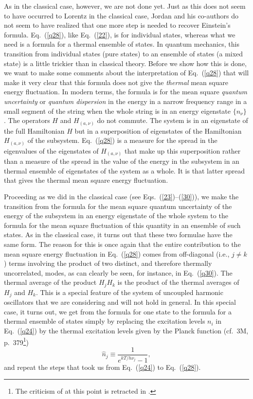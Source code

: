 \documentclass[12pt]{elsart}
\begin{document}
{As in the classical case, however, we are not done yet. Just as this does not seem to have occurred to Lorentz in the classical case, Jordan and his co-authors do not seem to have realized that one more step is needed to recover Einstein's formula. Eq.\ (\ref{q28}), like Eq.\ (\ref{22}), is for individual states, whereas what we need is a formula for a thermal ensemble of states. In quantum mechanics, this transition from individual states (pure states) to an ensemble of states (a mixed state) is a little trickier than in classical theory. Before we show how this is done, we 
want to make some comments about the interpretation of Eq.\ (\ref{q28}) that will make it very clear that this formula does not give the {\it thermal} mean square energy fluctuation. In modern terms,
the formula is for the mean square {\it quantum uncertainty} or {\it quantum dispersion} in the energy in a narrow frequency range in a small segment of the string when the whole string is in an energy eigenstate $\{ n_\nu \}$ . The operators $H$ and $H_{(a, \nu)}$ do not commute. The system is in an eigenstate of the full Hamiltonian $H$ but in a superposition of eigenstates of the Hamiltonian $H_{(a, \nu)}$ of the subsystem. Eq.\ (\ref{q28}) is a measure for the spread in the eigenvalues of the eigenstates of $H_{(a, \nu)}$ that make up this superposition rather than a measure of the spread in the value of the energy in the subsystem in an thermal ensemble of eigenstates of the system as a whole. It is that latter spread that gives the thermal mean square energy fluctuation. 

Proceeding as we did in the classical case (see Eqs.\ (\ref{23})--(\ref{30})), we make the transition from the formula for the mean square quantum uncertainty of the energy of the subsystem in an energy eigenstate of the whole system to the formula for the mean square fluctuation of this quantity in an ensemble of such states. As in the classical case, it turns out that these two formulae have the same form. The reason for this is once again that the entire
contribution to the mean square energy fluctuation in Eq.\ (\ref{q28}) comes from off-diagonal (i.e., $j \neq k$) terms involving the
product of two distinct, and therefore thermally uncorrelated, modes, as can clearly be seen, for instance, in Eq.\ (\ref{q30}). The thermal average of the product $H_j H_k$ is the product of the thermal averages of $H_j$ and $H_k$. This is a special feature of the system of uncoupled harmonic oscillators that we are considering and will not hold in general. In this special case, it turns out, we get from the formula for one state to the formula for a thermal ensemble of states simply by replacing the excitation levels $n_i$ in Eq.\ (\ref{q24}) by the thermal excitation levels given by the Planck function (cf.\ 3M, p.\ 379\footnote{The criticism of \citep{Debye 1910} at this point is retracted in \citep[p.\ 182, note]{Jordan 1928}.})
\begin{equation}
\hat{n}_{j} \equiv \frac{1}{e^{kT/h \nu_j}-1},
\label{q37}
\end{equation}
and repeat the steps that took us from Eq.\ (\ref{q24}) to Eq.\ (\ref{q28}).

}
\end{document}
